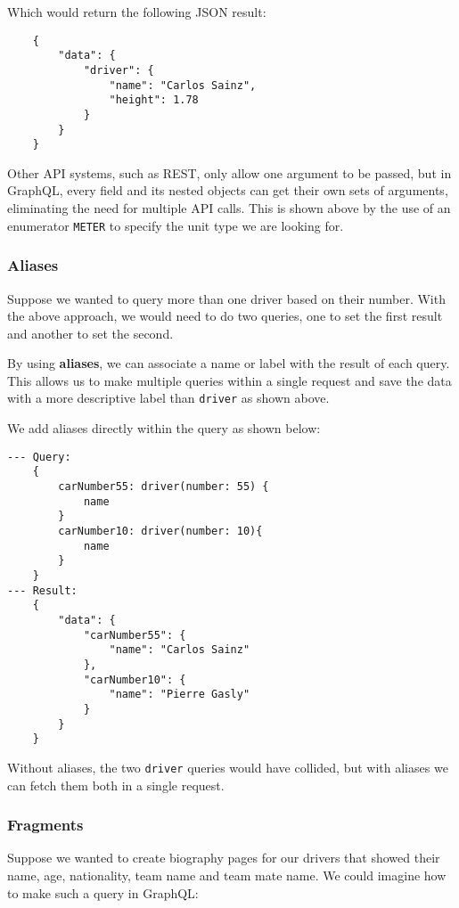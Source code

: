\documentclass{article}
\begin{document}
Which would return the following JSON result:

\begin{verbatim}
    {
        "data": {
            "driver": {
                "name": "Carlos Sainz",
                "height": 1.78
            }
        }
    }
\end{verbatim}

Other API systems, such as REST, only allow one argument to be passed, but in GraphQL, every field and its nested objects can get their own sets of arguments, eliminating the need for multiple API calls. This is shown above by the use of an enumerator \verb|METER| to specify the unit type we are looking for.

\subsubsection{Aliases}

Suppose we wanted to query more than one driver based on their number. With the above approach, we would need to do two queries, one to set the first result and another to set the second.

By using \textbf{aliases}, we can associate a name or label with the result of each query. This allows us to make multiple queries within a single request and save the data with a more descriptive label than \verb|driver| as shown above.

We add aliases directly within the query as shown below:

\begin{verbatim}
--- Query:
    {
        carNumber55: driver(number: 55) {
            name
        }
        carNumber10: driver(number: 10){
            name
        }
    }
--- Result:
    {
        "data": {
            "carNumber55": {
                "name": "Carlos Sainz"
            },
            "carNumber10": {
                "name": "Pierre Gasly"
            }
        }
    }
\end{verbatim}

Without aliases, the two \verb|driver| queries would have collided, but with aliases we can fetch them both in a single request.

\subsubsection{Fragments}

Suppose we wanted to create biography pages for our drivers that showed their name, age, nationality, team name and team mate name. We could imagine how to make such a query in GraphQL:
\end{document}
